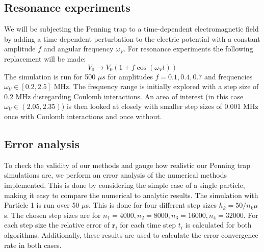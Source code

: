 \documentclass[english,notitlepage,reprint,nofootinbib]{revtex4-1}  %
\begin{document}
\subsection*{Resonance experiments}
We will be subjecting the Penning trap to a time-dependent electromagnetic field by adding a time-dependent perturbation
to the electric potential with a constant amplitude $f$ and angular frequency $\omega_V$. For resonance experiments the
following replacement will be made:
\begin{equation}
    V_0 \rightarrow V_0 (1 + f \cos(\omega_V t) )
\end{equation}
The simulation is run for 500 $\mu s$ for amplitudes $ f = 0.1, 0.4, 0.7$ and frequencies $\omega_V \in [0.2,2.5]$ MHz. The frequency
range is initially explored with a step size of $0.2$ MHz disregarding Coulomb interactions. An area of interest (in this case $\omega_V \in (2.05,2.35)$)
is then
looked at closely with smaller step sizes of 0.001 MHz once with Coulomb interactions and once without.

\subsection*{Error analysis}
To check the validity of our methods and gauge how realistic our Penning trap simulations are, we perform an error analysis of the
numerical methods implemented. This is done by considering the simple case of a single particle, making it easy to compare the numerical
to analytic results. The simulation with Particle 1 is run over 50 $\mu$s. This is done for four different step sizes $h_k = 50 / n_k \mu$s.
The chosen step sizes are for $n_1 = 4000, n_2 = 8000, n_3 = 16000, n_4 = 32000$. For each step size the relative error of $\textbf{r}_i$
for each time step $t_i$ is calculated for both algorithms.
Additionally, these results are used to calculate the error convergence rate in both cases.
\end{document}

